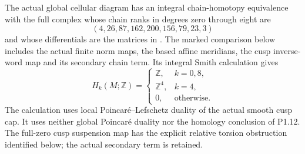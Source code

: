 \begin{theorem}\label{night:P1.19}
The actual global cellular diagram has an integral chain-homotopy
equivalence with the full complex whose chain ranks in degrees zero
through eight are
\[
 (4,26,87,162,200,156,79,23,3)
\]
and whose differentials are the matrices in
.
The marked comparison below includes the actual finite norm maps,
the based affine meridians, the cusp inverse-word map and its
secondary chain term. Its integral Smith calculation gives
\[
 H_k(M;\mathbb Z)=
 \begin{cases}
 \mathbb Z,&k=0,8,\\
 \mathbb Z^4,&k=4,\\
 0,&\text{otherwise}.
 \end{cases}
\]
The calculation uses local Poincar\'e--Lefschetz duality of the
actual smooth cusp cap. It uses neither global Poincar\'e duality
nor the homology conclusion of P1.12. The full-zero cusp suspension
map has the explicit relative torsion obstruction identified below;
the actual secondary term is retained.
\end{theorem}
